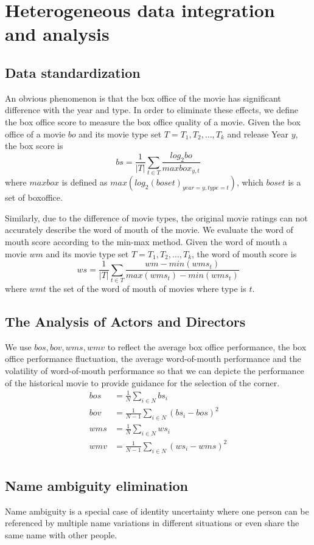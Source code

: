 \section{Heterogeneous data integration and analysis}
\label{sec:analyse}
\subsection{Data standardization}
An obvious phenomenon is that the box office of the movie has significant difference with the year and type. In order to eliminate these effects, we define the box office score to measure the box office quality of a movie. Given the box office of a movie $bo$ and its movie type set $T = {T_1,T_2,...,T_k}$ and release Year $y$, the box score is 
\begin{equation}
bs=\frac{1}{|T|}\sum_{t\in T}\frac{log_2bo}{maxbox_{y,t}}
\end{equation}
where $maxbox$ is defined as $max(log_2(boset)_{year=y,type=t})$, which $boset$ is a set of boxoffice.\\
\par Similarly, due to the difference of movie types, the original movie ratings can not accurately describe the word of mouth of the movie. We evaluate the word of mouth score according to the min-max method. Given the word of mouth a movie $wm$ and its movie type set $T = {T_1,T_2,...,T_k}$, the word of mouth score is 
\begin{equation}
ws=\frac{1}{|T|}\sum_{t\in T}\frac{wm-min(wms_t)}{max(wms_t)-min(wms_t)}
\end{equation}
where $wmt$ the set of the word of mouth of movies where type is $t$.
\subsection{The Analysis of Actors and Directors}
We use $bos,bov,wms,wmv$ to reflect the average box office performance, the box office performance fluctuation, the average word-of-mouth performance and the volatility of word-of-mouth performance so that we can depicte the performance of the historical movie to provide guidance for the selection of the corner.
\begin{subequations}
\begin{align}
bos &=  \frac{1}{N}\sum_{i\in N}bs_i\\
bov &= \frac{1}{N-1}\sum_{i\in N}(bs_i-bos)^2\\
wms &=  \frac{1}{N}\sum_{i\in N}ws_i\\
wmv &= \frac{1}{N-1}\sum_{i\in N}(ws_i-wms)^2\\
\end{align}

\end{subequations}
\subsection{Name ambiguity elimination}
Name ambiguity is a special case of identity uncertainty where one person can be referenced by multiple name variations in different situations or even share the same name with other people.



